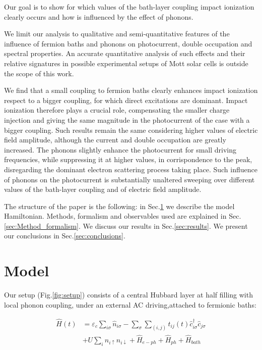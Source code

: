 \documentclass[aps,prb,groupedaddress,showpacs,twocolumn,superscriptaddress,10pt]{revtex4-2}
\begin{document}
Our goal is to show for which values of the bath-layer coupling impact ionization clearly occurs and how is influenced by the effect of phonons. 

We limit our analysis to qualitative and semi-quantitative features of the influence of fermion baths and phonons on photocurrent, double occupation and spectral properties. 
An accurate quantitative analysis of such effects and their relative signatures in possible experimental setups of Mott solar cells is outside the scope of this work. 
     

We find that a small coupling to fermion baths clearly enhances impact ionization respect to a bigger coupling, for which direct excitations are dominant. Impact ionization therefore plays a crucial role, compensating the smaller charge injection and giving the same magnitude in the photocurrent of the case with a bigger coupling. Such results remain the same considering higher values of electric field amplitude, although the current and double occupation are greatly increased. The phonons slightly enhance the photocurrent for small driving frequencies, while suppressing it at higher values, in corrispondence to the peak, disregarding the dominant electron scattering process taking place. Such influence of phonons on the photocurrent is substantially unaltered sweeping over different values of the bath-layer coupling and of electric field amplitude.  

The structure of the paper is the following: in Sec.\ref{sec:Model} we describe the model Hamiltonian. Methods, formalism and observables used are explained in Sec.\ref{sec:Method_formalism}. We discuss our results in Sec.\ref{sec:results}. We present our conclusions in Sec.\ref{sec:conclusions}. 
 
  
\section{Model}
\label{sec:Model}

Our setup (Fig.\ref{fig:setup}) consists of a central Hubbard layer at half filling with local phonon coupling, under an external AC driving,attached to fermionic baths: 

\begin{equation}
\label{eq:Hamiltonian}
\begin{split} 
\hat{H}(t)&=\varepsilon_c \sum_{i\sigma}\hat{n}_{i\sigma} -\sum_{\sigma}\sum_{(i,j)} t_{ij}(t) \hat{c}^{\dagger}_{i\sigma} \hat{c}_{j\sigma}
\\ & + U \sum_{i} \hat{n}_{i\uparrow} \hat{n}_{i\downarrow}+\hat{H}_{e-ph} + \hat{H}_{ph}+\hat{H}_{bath}
\end{split}
\end{equation} 
\end{document}
